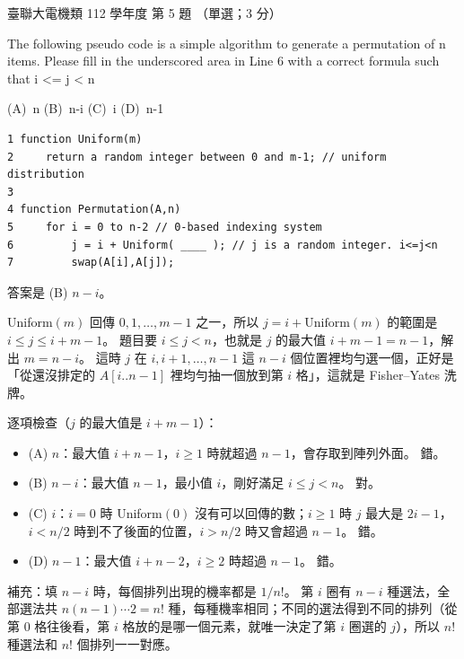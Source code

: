\begin{pastexam}[label={px:ust-112-ee-ds-05}]{臺聯大電機類 112 學年度 第 5 題}
（單選；3 分）

The following pseudo code is a simple algorithm to generate a permutation of n items. Please fill
in the underscored area in Line 6 with a correct formula such that i <= j < n

(A)~n \qquad (B)~n-i \qquad (C)~i \qquad (D)~n-1
\begin{lstlisting}[basicstyle=\ttfamily\small, frame=single, columns=fullflexible,
    keepspaces=true]
1 function Uniform(m)
2     return a random integer between 0 and m-1; // uniform distribution
3
4 function Permutation(A,n)
5     for i = 0 to n-2 // 0-based indexing system
6         j = i + Uniform( ____ ); // j is a random integer. i<=j<n
7         swap(A[i],A[j]);
\end{lstlisting}
\end{pastexam}

\begin{pastsoln}
答案是 (B) $n - i$。

Uniform$(m)$ 回傳 $0, 1, \ldots, m - 1$ 之一，所以 $j = i + \text{Uniform}(m)$ 的範圍是
$i \le j \le i + m - 1$。 題目要 $i \le j < n$，也就是 $j$ 的最大值 $i + m - 1 = n - 1$，解出
$m = n - i$。 這時 $j$ 在 $i, i + 1, \ldots, n - 1$ 這 $n - i$ 個位置裡均勻選一個，正好是
「從還沒排定的 $A[i..n-1]$ 裡均勻抽一個放到第 $i$ 格」，這就是 Fisher--Yates 洗牌。

逐項檢查（$j$ 的最大值是 $i + m - 1$）：
\begin{itemize}
\item (A) $n$：最大值 $i + n - 1$，$i \ge 1$ 時就超過 $n - 1$，會存取到陣列外面。 錯。
\item (B) $n - i$：最大值 $n - 1$，最小值 $i$，剛好滿足 $i \le j < n$。 對。
\item (C) $i$：$i = 0$ 時 Uniform$(0)$ 沒有可以回傳的數；$i \ge 1$ 時 $j$ 最大是 $2i - 1$，
$i < n/2$ 時到不了後面的位置，$i > n/2$ 時又會超過 $n - 1$。 錯。
\item (D) $n - 1$：最大值 $i + n - 2$，$i \ge 2$ 時超過 $n - 1$。 錯。
\end{itemize}

補充：填 $n - i$ 時，每個排列出現的機率都是 $1/n!$。 第 $i$ 圈有 $n - i$ 種選法，全部選法共
$n (n - 1) \cdots 2 = n!$ 種，每種機率相同；不同的選法得到不同的排列（從第 $0$ 格往後看，第 $i$
格放的是哪一個元素，就唯一決定了第 $i$ 圈選的 $j$），所以 $n!$ 種選法和 $n!$ 個排列一一對應。
\end{pastsoln}

